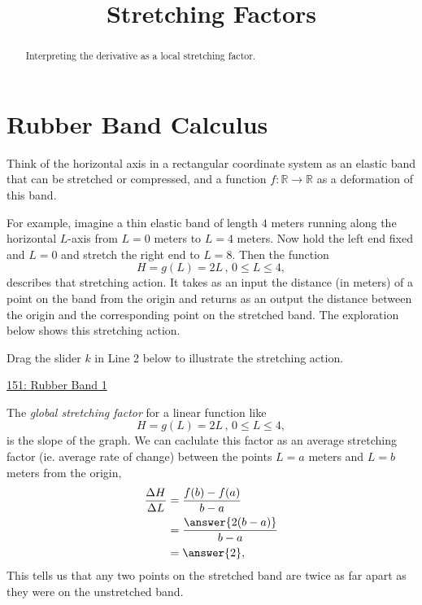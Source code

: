 \documentclass{ximera}
\title{Stretching Factors}
\begin{document}
\begin{abstract}
Interpreting the derivative as a local stretching factor.
\end{abstract}
\maketitle

\section{Rubber Band Calculus}

Think of the horizontal axis in a rectangular coordinate system as an elastic band that can be stretched or compressed, and a function $f : \mathbb{R}\to\mathbb{R}$ as a deformation of this band. %

For example, imagine a thin elastic band of length $4$ meters running along the horizontal $L$-axis from $L=0$ meters to $L=4$ meters.  Now hold the left end fixed and $L=0$ and stretch the right end to $L=8$. Then the function
\[
      H = g(L) = 2L \, , \, 0\leq L \leq 4 ,
\]
describes that stretching action. It takes as an input the distance (in meters) of a point on the band from the origin and returns as an output the distance between the origin and the corresponding point on the stretched band. The exploration below shows this stretching action.

\begin{exploration} \label{Ex:98f3rgafgbb}
Drag the slider $k$ in Line 2 below to illustrate the stretching action.

\begin{onlineOnly}
    \begin{center}
\end{center}
\end{onlineOnly}

\href{https://www.desmos.com/calculator/qejivz36ui}{151: Rubber Band 1}

\end{exploration}

The \emph{global stretching factor} for a linear function like %
\[
      H = g(L) = 2L \, , \, 0\leq L \leq 4 ,
\]
is the slope of the graph. We can caclulate this factor as an average stretching factor (ie. average rate of change) between the points $L=a$  meters and $L=b$ meters from the origin,
\begin{align*}
  \frac{\Delta H}{\Delta L} &= \frac{f(b) - f(a)}{b-a} \\
                                       &= \frac{\answer{2(b-a)}}{b-a} \\
                                       &= \answer{2},
\end{align*}
This tells us that any two points on the stretched band are twice as far apart as they were on the unstretched band.
\end{document}
